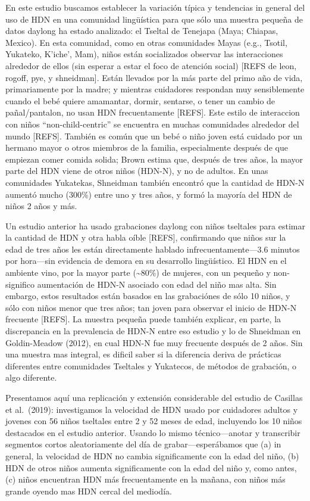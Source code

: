 \documentclass[
  english,
  ,man,floatsintext]{apa6}
\begin{document}
En este estudio buscamos establecer la variación típica y tendencias in general del uso de HDN en una comunidad lingüística para que sólo una muestra pequeña de datos daylong ha estado analizado: el Tseltal de Tenejapa (Maya; Chiapas, Mexico). En esta comunidad, como en otras comunidades Mayas (e.g., Tsotil, Yukateko, K'iche', Mam), niños están socializados observar las interacciones alrededor de ellos (sin esperar a estar el foco de atención social) {[}REFS de leon, rogoff, pye, y shneidman{]}. Están llevados por la más parte del primo año de vida, primariamente por la madre; y mientras cuidadores respondan muy sensiblemente cuando el bebé quiere amamantar, dormir, sentarse, o tener un cambio de pañal/pantalon, no usan HDN frecuentamente {[}REFS{]}. Este estilo de interaccion con niños ``non-child-centric'' se encuentra en muchas comunidades alrededor del mundo {[}REFS{]}. También es común que un bebé o niño joven está cuidado por un hermano mayor o otros miembros de la familia, especialmente después de que empiezan comer comida solida; Brown estima que, después de tres años, la mayor parte del HDN viene de otros niños (HDN-N), y no de adultos. En unas comunidades Yukatekas, Shneidman también encontró que la cantidad de HDN-N aumentó mucho (300\%) entre uno y tres años, y formó la mayoría del HDN de niños 2 años y más.

Un estudio anterior ha usado grabaciones daylong con niños tseltales para estimar la cantidad de HDN y otra habla oíble {[}REFS{]}, confirmando que niños sur la edad de tres años les están directamente hablado infrecuentamente---3.6 minutos por hora---sin evidencia de demora en su desarrollo lingüístico. El HDN en el ambiente vino, por la mayor parte (\textasciitilde80\%) de mujeres, con un pequeño y non-significo aumentación de HDN-N asociado con edad del niño mas alta. Sin embargo, estos resultados están basados en las grabaciónes de sólo 10 niños, y sólo con niños menor que tres años; tan joven para observar el inicio de HDN-N frecuente {[}REFS{]}. La muestra pequeña puede también explicar, en parte, la discrepancia en la prevalencia de HDN-N entre eso estudio y lo de Shneidman en Goldin-Meadow (2012), en cual HDN-N fue muy frecuente después de 2 años. Sin una muestra mas integral, es dificil saber si la diferencia deriva de prácticas diferentes entre comunidades Tseltales y Yukatecos, de métodos de grabación, o algo diferente.

Presentamos aquí una replicación y extensión considerable del estudio de Casillas et al.~(2019): investigamos la velocidad de HDN usado por cuidadores adultos y jovenes con 56 niños tseltales entre 2 y 52 meses de edad, incluyendo los 10 niños destacados en el estudio anterior. Usando lo mismo técnico---anotar y transcribir segmentos cortos aleatoriamente del día de grabar---esperábamos que (a) in general, la velocidad de HDN no cambia significamente con la edad del niño, (b) HDN de otros niños aumenta significamente con la edad del niño y, como antes, (c) niños encuentran HDN más frecuentamente en la mañana, con niños más grande oyendo mas HDN cercal del mediodía.
\end{document}

